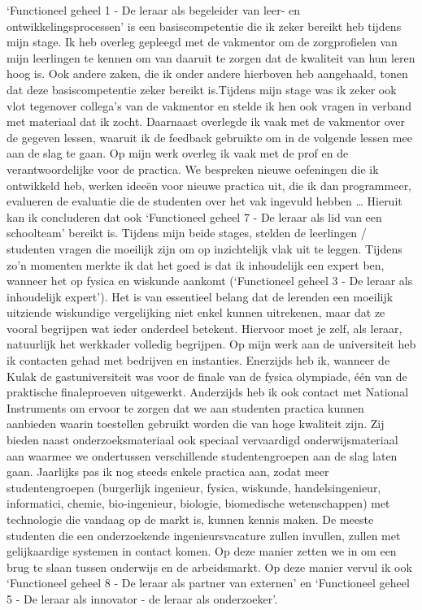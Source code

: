 \documentclass[a4paper,12pt,twoside]{article}%
\begin{document}
`Functioneel geheel 1 - De leraar als begeleider van leer- en ontwikkelingsprocessen' is een basiscompetentie die ik zeker bereikt heb tijdens mijn stage. Ik heb overleg gepleegd met de vakmentor om de zorgprofielen van mijn leerlingen te kennen om van daaruit te zorgen dat de kwaliteit van hun leren hoog is. Ook andere zaken, die ik onder andere hierboven heb aangehaald, tonen dat deze basiscompetentie zeker bereikt is.\newline Tijdens mijn stage was ik zeker ook vlot tegenover collega's van de vakmentor en stelde ik hen ook vragen in verband met materiaal dat ik zocht. Daarnaast overlegde ik vaak met de vakmentor over de gegeven lessen, waaruit ik de feedback gebruikte om in de volgende lessen mee aan de slag te gaan. Op mijn werk overleg ik vaak met de prof en de verantwoordelijke voor de practica. We bespreken nieuwe oefeningen die ik ontwikkeld heb, werken  ideeën voor nieuwe practica uit, die ik dan programmeer, evalueren de evaluatie die de studenten over het vak ingevuld hebben \ldots{} Hieruit kan ik concluderen dat ook `Functioneel geheel 7 - De leraar als lid van een schoolteam' bereikt is.\newline 
Tijdens mijn beide stages, stelden de leerlingen / studenten vragen die moeilijk zijn om op inzichtelijk vlak uit te leggen. Tijdens zo'n momenten merkte ik dat het goed is dat ik inhoudelijk een expert ben, wanneer het op fysica en wiskunde aankomt (`Functioneel geheel 3 - De leraar als inhoudelijk expert'). Het is van essentieel belang dat de lerenden een moeilijk uitziende wiskundige vergelijking niet enkel kunnen uitrekenen, maar dat ze vooral begrijpen wat ieder onderdeel betekent. Hiervoor moet je zelf, als leraar, natuurlijk het werkkader volledig begrijpen.\newline
Op mijn werk aan de universiteit heb ik contacten gehad  met bedrijven en instanties. Enerzijds heb ik, wanneer de Kulak de gastuniversiteit was voor de finale van de fysica olympiade, één van de praktische finaleproeven uitgewerkt. Anderzijds heb ik ook contact met National Instruments om ervoor te zorgen dat we aan studenten practica kunnen aanbieden waarin toestellen gebruikt worden die van hoge kwaliteit zijn. Zij bieden naast onderzoeksmateriaal ook speciaal vervaardigd onderwijsmateriaal aan waarmee we ondertussen verschillende studentengroepen aan de slag laten gaan. Jaarlijks pas ik nog steeds enkele practica aan, zodat meer studentengroepen (burgerlijk ingenieur, fysica, wiskunde, handelsingenieur, informatici, chemie, bio-ingenieur, biologie, biomedische wetenschappen) met technologie die vandaag op de markt is, kunnen kennis maken. De meeste studenten die een onderzoekende ingenieursvacature zullen invullen, zullen met gelijkaardige systemen in contact komen. Op deze manier zetten we in om een brug te slaan tussen onderwijs en de arbeidsmarkt.  Op deze manier vervul ik ook `Functioneel geheel 8 - De leraar als partner van externen' en `Functioneel geheel 5 - De leraar als innovator - de leraar als onderzoeker'.\newline
\end{document}

